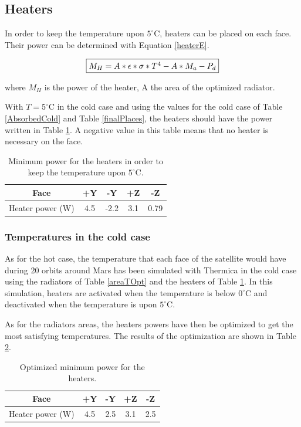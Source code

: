 \documentclass[a4paper, oneside, 11pt]{article}
\begin{document}
\subsection{Heaters}

In order to keep the temperature upon $5^{\circ}$C, heaters can be placed on each face. Their power can be determined with Equation \ref{heaterE}.

\begin{equation}
\fbox{$M_H= A*\epsilon*\sigma*T^4-A*M_a-P_d$}
\label{heaterE}
\end{equation}

where $M_H$ is the power of the heater, A the area of the optimized radiator. 

With $T=5^{\circ}$C in the cold case and using the values for the cold case of Table \ref{AbsorbedCold} and Table \ref{finalPlaces}, the heaters should have the power written in Table \ref{heaterT}. A negative value in this table means that no heater is necessary on the face.

\begin{table}[!h]
 \caption{Minimum power for the heaters in order to keep the temperature upon $5^{\circ}$C.}
 \label{heaterT}
\centering 
\begin{tabular}{| c | c |c |c |c |}
  \hline
Face & +Y &  -Y  & +Z & -Z  \\
   \hline
 Heater power (W) & 4.5 & -2.2 & 3.1  & 0.79\\
     \hline
\end{tabular}
\end{table}


\subsubsection{Temperatures in the cold case}

As for the hot case, the temperature that each face of the satellite would have during 20 orbits around Mars has been simulated with Thermica in the cold case using the radiators of Table \ref{areaTOpt} and the heaters of Table \ref{heaterT}. In this simulation, heaters are activated when the temperature is below $0^{\circ}$C and deactivated when the temperature is upon $5^{\circ}$C.

As for the radiators areas, the heaters powers have then be optimized to get the most satisfying temperatures. The results of the optimization are shown in Table \ref{heaterTopti}. 

\begin{table}[H]
 \caption{Optimized minimum power for the heaters.}
 \label{heaterTopti}
\centering 
\begin{tabular}{| c | c |c |c |c |}
  \hline
Face & +Y &  -Y  & +Z & -Z  \\
   \hline
 Heater power (W) & 4.5 & 2.5 & 3.1  & 2.5\\
     \hline
\end{tabular}
\end{table}
\end{document}
